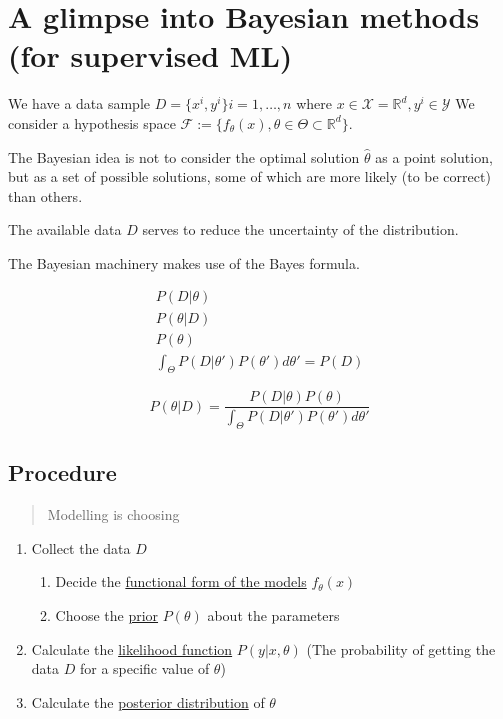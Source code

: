\section{A glimpse into Bayesian methods (for supervised ML)}

We have a data sample \(D = \{ x^i, y^i\} i = 1, \dots, n\)
where \(x \in \mathcal{X} = \mathds{R}^d, y^i \in \mathcal{Y}\)
We consider a hypothesis space
\(\mathcal{F} := \{ f_\theta (x), \theta \in \Theta \subset \mathds{R}^d \}\).

The Bayesian idea is not to consider the optimal solution
\(\hat{\theta}\) as a point solution, but as a set of possible solutions,
some of which are more likely (to be correct) than others.

The available data \(D\) serves to reduce the uncertainty of the
distribution.

The Bayesian machinery makes use of the Bayes formula.

\begin{align*}
	P(D | \theta) \tag{likelihood} \\
	P(\theta | D) \tag{posterior}  \\
	P(\theta) \tag{prior}          \\
	\int_\Theta P(D | \theta') P(\theta') d\theta' = P(D) \tag{EXPECTED \equiv EVIDENCE}
\end{align*}

\[
	P(\theta | D) = \frac{P(D | \theta) P(\theta)}
	{ \int_\Theta P(D | \theta') P(\theta') d\theta' }
\]

\subsection{Procedure}

\begin{quote}
	Modelling is choosing
\end{quote}

\begin{enumerate}
	\item
	      Collect the data \(D\)

	      \begin{enumerate}
		      \item
		            Decide the \uline{functional form of the models} \(f_\theta (x)\)
		      \item
		            Choose the \uline{prior} \(P(\theta)\) about the parameters
	      \end{enumerate}
	\item
	      Calculate the \uline{likelihood function} \(P(y | x, \theta)\) (The
	      probability of getting the data \(D\) for a specific value of
	      \(\theta\))
	\item
	      Calculate the \uline{posterior distribution} of \(\theta\)
\end{enumerate}

